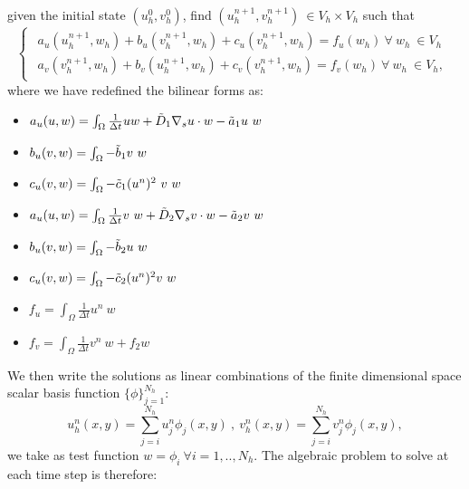 given the initial state $(u_h^0, v_h^0)$, find $(u_h^{n+1}, v_h^{n+1}) \ \in V_h \times V_h$ such that
\begin{equation}\label{eq:GalerkinT}
\left\lbrace
\begin{matrix}
\begin{aligned}
  a_u(u_h^{n+1}, w_h) + b_u(v_h^{n+1}, w_h) + c_{u}(v_h^{n+1}, w_h) = f_u(w_h) \ \forall \ w_h \ \in V_h \\
  a_v(v_h^{n+1}, w_h) + b_v(u_h^{n+1}, w_h) + c_{v}(v_h^{n+1}, w_h) = f_v(w_h) \ \forall \ w_h \ \in V_h,
\end{aligned}
\end{matrix}
\right.
\end{equation}
where we have redefined the bilinear forms as:
\begin{itemize}
    \item $a_u(u, w) = \int_{\Omega} \frac{1}{\Delta t} u w + \Tilde{D}_1 \nabla_s u \cdot w - \Tilde{a}_1 u \ w $
    \item $b_u(v, w) = \int_{\Omega} - \Tilde{b}_1 v \ w$
    \item $ c_{u}(v, w) = \int_{\Omega} - \Tilde{c}_1 (u^n)^2 \ v \ w$
    \item $a_u(u, w) = \int_{\Omega} \frac{1}{\Delta t} v \ w + \Tilde{D}_2 \nabla_s v \cdot w - \Tilde{a}_2 v \ w $
    \item $b_u(v, w) = \int_{\Omega} - \Tilde{b}_2 u \ w$
    \item $c_{u}(v, w) = \int_{\Omega} - \Tilde{c}_2 (u^n)^2 v \ w$
    \item $f_u = \int_{\Omega} \frac{1}{\Delta t} u^n \ w$
    \item $f_v = \int_{\Omega} \frac{1}{\Delta t} v^n \ w + f_2 w$
\end{itemize}
We then write the solutions as linear combinations of the finite dimensional space scalar basis function $\{ \phi \}_{j=1}^{N_h}$:
\begin{equation}
        u_h^n(x,y) = \sum_{j=i}^{N_h} u_j^n \phi_j(x,y) \ , \ v_h^n(x,y) = \sum_{j=i}^{N_h} v_j^n \phi_j(x,y),
\end{equation}
we take as test function $w = \phi_i \ \forall i = 1,.., N_h$. The algebraic problem to solve at each time step is therefore:

